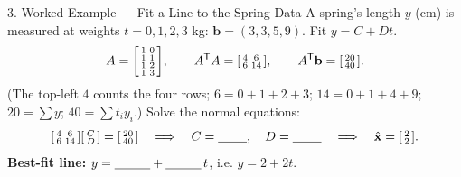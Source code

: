 \documentclass[10pt]{article}
\newcommand{\xx}{\mathbf{x}}
\newcommand{\bb}{\mathbf{b}}
\newcommand{\T}{\mathsf{T}}
\begin{document}
\begin{notesbox}{3. Worked Example --- Fit a Line to the Spring Data}
A spring's length $y$ (cm) is measured at weights $t=0,1,2,3$ kg: $\bb=(3,3,5,9)$. Fit $y=C+Dt$.
\[
  A=\begin{bsmallmatrix} 1 & 0\\ 1 & 1\\ 1 & 2\\ 1 & 3 \end{bsmallmatrix},\qquad
  A^{\T}A=\begin{bsmallmatrix} 4 & 6\\ 6 & 14 \end{bsmallmatrix},\qquad
  A^{\T}\bb=\begin{bsmallmatrix} 20\\ 40 \end{bsmallmatrix}.
\]
(The top-left $4$ counts the four rows; $6=0{+}1{+}2{+}3$; $14=0{+}1{+}4{+}9$; $20=\sum y$;
$40=\sum t_i y_i$.) Solve the normal equations:
\[
  \begin{bsmallmatrix} 4 & 6\\ 6 & 14 \end{bsmallmatrix}\begin{bsmallmatrix} C\\ D \end{bsmallmatrix}
  =\begin{bsmallmatrix} 20\\ 40 \end{bsmallmatrix}
  \quad\Longrightarrow\quad
  C=\blank{0.8cm},\quad D=\blank{0.8cm}
  \quad\Longrightarrow\quad \hat{\xx}=\begin{bsmallmatrix} 2\\ 2 \end{bsmallmatrix}.
\]
\textbf{Best-fit line:} $y=\blank{1.0cm}+\blank{1.0cm}\,t$, i.e. $y=2+2t$.
\end{notesbox}
\end{document}
